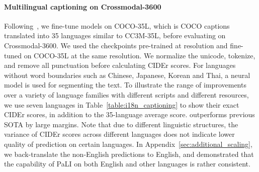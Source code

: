 \documentclass{article}
\begin{document}
\paragraph{Multilingual captioning on Crossmodal-3600} Following~\citet{xm3600}, we fine-tune \NAME models on COCO-35L, which is COCO captions translated into 35 languages similar to CC3M-35L, before evaluating on Crossmodal-3600. We used the checkpoints pre-trained at  resolution and fine-tuned on COCO-35L at the same resolution.
We normalize the unicode, tokenize, and remove all punctuation before calculating CIDEr scores.
For languages without word boundaries such as Chinese, Japanese, Korean and Thai, a neural model is used for segmenting the text.
To illustrate the range of improvements over a variety of language families with different scripts and different resources, we use seven languages in Table~\ref{table:i18n_captioning} to show their exact CIDEr scores, in addition to the 35-language average score. \NAME outperforms previous SOTA by large margins. Note that due to different linguistic structures, the variance of CIDEr scores across different languages does not indicate lower quality of prediction on certain languages. In Appendix~\ref{sec:additional_scaling}, we back-translate the non-English predictions to English, and demonstrated that the capability of PaLI on both English and other languages is rather consistent.

\begin{table}[ht!]
\caption{CIDEr scores on image captioning for the Crossmodal-3600 benchmark for seven diverse languages (English, French, Hindi, Hebrew, Romanian, Thai, and Chinese), as well as the average of the 35 languages covered by the benchmark.} 
\centering
{}
\label{table:i18n_captioning}
\end{table}
\end{document}
